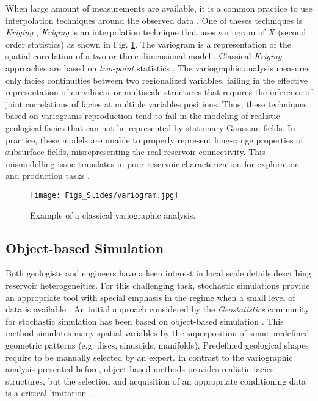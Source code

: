 When large amount of measurements are available, it is a common practice to use interpolation techniques around the observed data \citep{kitanidis_1997_a}. One of theses techniques is \emph{Kriging} \citep{gaoetal1996, vangroenigenetal1999, Blackwell1998, abellan_2010a}, \emph{Kriging} is an interpolation technique that uses variogram of $X$ (second order statistics) \citep{Lam_1983_a} as shown in Fig. \ref{fig:VarioExample}. The variogram is a representation of the spatial correlation of a two or three dimensional model \citep{abellan_2010a}. Classical \emph{Kriging} approaches are based on \emph{two-point} statistics \citep{kitanidis_1997_a}. The variographic analysis measures only facies continuities between two regionalized variables, failing in the effective representation of curvilinear or multiscale structures that requires the inference of joint correlations of facies at multiple variables positions. Thus, these techniques based on variograms reproduction tend to fail in the modeling of realistic geological facies that can not be represented by stationary Gaussian fields. In practice, these models are unable to properly represent long-range properties of subsurface fields, misrepresenting the real reservoir connectivity. This mismodelling issue translates in poor reservoir characterization for exploration and production tasks \citep{Ortiz_2004_a,Bangerth_2005,olea1984_a}.

		\begin{figure}[H]
		\centering
		\texttt{[image: Figs\_Slides/variogram.jpg]}

		\caption{Example of a classical variographic analysis.}
		\label{fig:VarioExample}
		\end{figure}
		
		
		
		
\subsection{Object-based Simulation}

Both geologists and engineers have a keen interest in local scale details describing reservoir heterogeneities. For this challenging task, stochastic simulations provide an appropriate tool with special emphasis in the regime when a small level of data is available \citep{kitanidis_1997_a,Lam_1983_a}. An initial approach considered by the \textit{Geostatistics} community for stochastic simulation has been based on object-based simulation \citep{Holden_1998_a,Chiles_1999_aa}. This method simulates many spatial variables by the superposition of some predefined geometric patterns (e.g. discs, sinusoids, manifolds). Predefined geological shapes require to be manually selected by an expert. In contrast to the variographic analysis presented before, object-based methods provides realistic facies structures, but the selection and acquisition of an appropriate conditioning data is a critical limitation \citep{Holden_1998_a,Chiles_1999_aa}.


